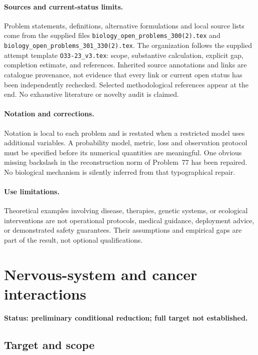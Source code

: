 \documentclass[11pt]{article}
\begin{document}
\paragraph{Sources and current-status limits.}
Problem statements, definitions, alternative formulations and local source lists
come from the supplied files
\texttt{biology\_open\_problems\_300(2).tex} and
\texttt{biology\_open\_problems\_301\_330(2).tex}.
The organization follows the supplied attempt template
\texttt{O33-23\_v3.tex}: scope, substantive calculation, explicit gap,
completion estimate, and references. Inherited source annotations and links are
catalogue provenance, not evidence that every link or current open status has
been independently rechecked. Selected methodological references appear at the
end. No exhaustive literature or novelty audit is claimed.

\paragraph{Notation and corrections.}
Notation is local to each problem and is restated when a restricted model uses
additional variables. A probability model, metric, loss and observation protocol
must be specified before its numerical quantities are meaningful. One obvious
missing backslash in the reconstruction norm of Problem~77 has been repaired.
No biological mechanism is silently inferred from that typographical repair.

\paragraph{Use limitations.}
Theoretical examples involving disease, therapies, genetic systems, or ecological
interventions are not operational protocols, medical guidance, deployment advice,
or demonstrated safety guarantees. Their assumptions and empirical gaps are part
of the result, not optional qualifications.


\section*{Nervous-system and cancer interactions}
\label{prob:244}
\noindent\textbf{Status: preliminary conditional reduction; full target not established.}
\subsection{Target and scope}
\end{document}
